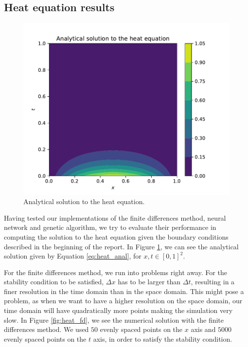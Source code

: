 \documentclass[aps,reprint,superscriptaddress,nofootinbib]{revtex4-2}
\begin{document}
\subsection{Heat equation results}

\begin{figure}[htp]
    \centering
    \includegraphics[scale=0.5]{figs/analytical.pdf}
    \caption{Analytical solution to the heat equation.}
    \label{fig:analytical}
\end{figure}

    Having tested our implementations of the finite differences method, neural network and genetic algorithm, we try to evaluate their performance in computing the solution to the heat equation given the boundary conditions described in the beginning of the report. In Figure \ref{fig:analytical}, we can see the analytical solution given by Equation \eqref{eq:heat_anal}, for \(x,t \in [0, 1]^2\).

    For the finite differences method, we run into problems right away. For the stability condition to be satisfied, \(\Delta x\) has to be larger than \(\Delta t\), resulting in a finer resolution in the time domain than in the space domain. This might pose a problem, as when we want to have a higher resolution on the space domain, our time domain will have quadratically more points making the simulation very slow. In Figure \ref{fig:heat_fd}, we see the numerical solution with the finite differences method. We used \(50\) evenly spaced points on the \(x\) axis and \(5000\) evenly spaced points on the \(t\) axis, in order to satisfy the stability condition.
\end{document}
